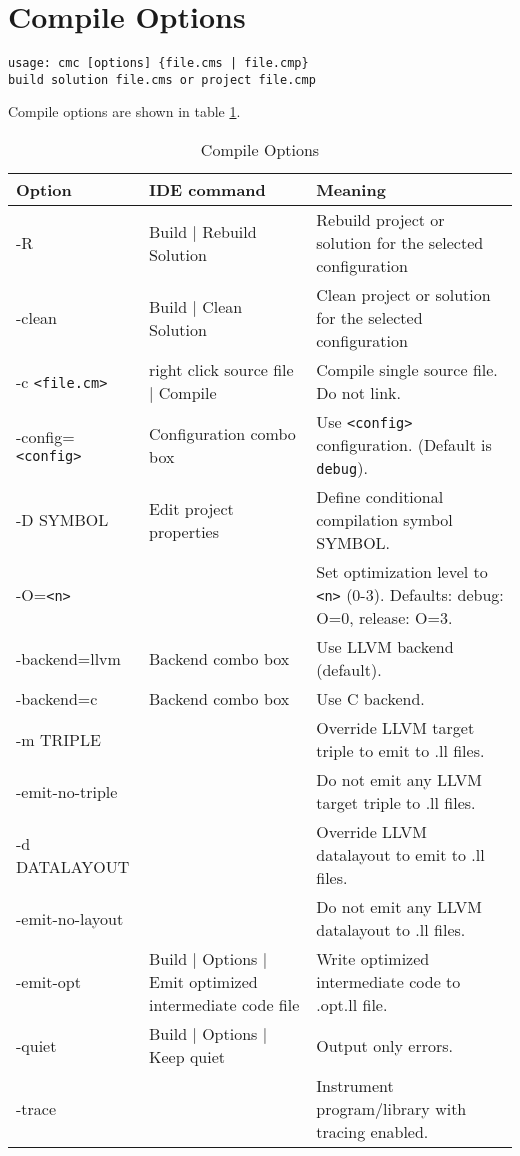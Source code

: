 \documentclass[oneside, a4paper, 11pt]{article}
\begin{document}
\section{Compile Options}

\begin{verbatim}
usage: cmc [options] {file.cms | file.cmp}
build solution file.cms or project file.cmp
\end{verbatim}

Compile options are shown in table \ref{tab:options}.

\begin{table}[htb]
\caption{Compile Options}\label{tab:options}
\begin{tabular}{lp{5cm}p{5cm}}
\textbf{Option}& \textbf{IDE command}& \textbf{Meaning}\\
\hline
-R & Build $|$ Rebuild Solution & Rebuild project or solution for the selected configuration\\
-clean & Build $|$ Clean Solution & Clean project or solution for the selected configuration\\
-c \verb|<file.cm>| & right click source file $|$ Compile & Compile single source file. Do not link.\\
-config=\verb|<config>| & Configuration combo box & Use \verb|<config>| configuration. (Default is \verb|debug|).\\
-D SYMBOL & Edit project properties & Define conditional compilation symbol SYMBOL.\\
-O=\verb|<n>| & & Set optimization level to \verb|<n>| (0-3). Defaults: debug: O=0, release: O=3.\\
-backend=llvm & Backend combo box & Use LLVM backend (default).\\
-backend=c & Backend combo box & Use C backend.\\
-m TRIPLE & & Override LLVM target triple to emit to .ll files.\\
-emit-no-triple & & Do not emit any LLVM target triple to .ll files.\\
-d DATALAYOUT & & Override LLVM datalayout to emit to .ll files.\\
-emit-no-layout & & Do not emit any LLVM datalayout to .ll files.\\
-emit-opt & Build $|$ Options $|$ Emit optimized intermediate code file & Write optimized intermediate code to .opt.ll file.\\
-quiet & Build $|$ Options $|$ Keep quiet & Output only errors.\\
-trace & & Instrument program/library with tracing enabled.\\

\end{tabular}
\end{table}
\end{document}
